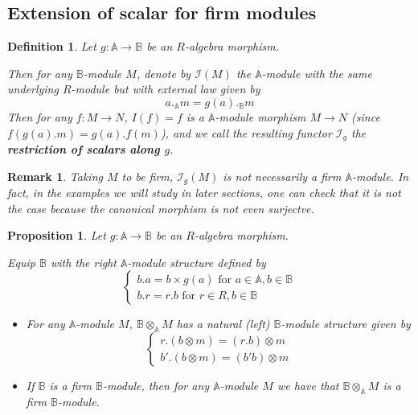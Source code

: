 \documentclass[a4paper,fleqn]{cas-sc}
\newtheorem{prop}[thm]{Proposition}%
\newtheorem{rem}{Remark}%
\newtheorem{dfnt}{Definition}%
\newcommand{\cI}{\mathcal{I}}
\newcommand{\bA}{\mathbb{A}}
\newcommand{\bB}{\mathbb{B}}
\begin{document}
\subsection{Extension of scalar for firm modules}
\label{sec:extensionscalar}

\begin{dfnt}
Let $g : \bA \to \bB$ be an $R$-algebra morphism.

Then for any $\bB$-module $M$, denote by $\cI(M)$ the $\bA$-module with the same underlying $R$-module but with external law given by
\[
a._\bA m = g(a)._\bB m
\]
Then for any $f : M \to N$, $I(f) = f$ is a $\bA$-module morphism $M \to N$ (since $f( g(a).m) = g(a).f(m)$), and we call the resulting functor $\cI_g$ the \textbf{restriction of scalars along $g$}.
\end{dfnt}

\begin{rem}
Taking $M$ to be firm, $\cI_g(M)$ is not necessarily a firm $\bA$-module. In fact, in the examples we will study in later sections, one can check that it is not the case because the canonical morphism is not even surjectve.
\end{rem}

\begin{prop}
Let $g : \bA \to \bB$ be an $R$-algebra morphism.

Equip $\bB$ with the right $\bA$-module structure defined by
\[
\begin{cases}
b.a = b \times g(a) \text{ for } a\in \bA, b \in \bB 
\\
b.r = r.b\text{ for } r \in R, b \in \bB 
\end{cases}
\]

\begin{itemize}
    \item For any $\bA$-module $M$, $\bB \otimes_\bA M$ has a natural (left) $\bB$-module structure given by
    \[
    \begin{cases}
    r.(b \otimes m) = (r.b) \otimes m \\
    b' .(b \otimes m) = (b'b) \otimes m
    \end{cases}
    \]
    \item If $\bB$ is a firm $\bB$-module, then for any $\bA$-module $M$ we have that $\bB \otimes_\bA M$ is a firm $\bB$-module.
\end{itemize}
\end{prop}
\end{document}
